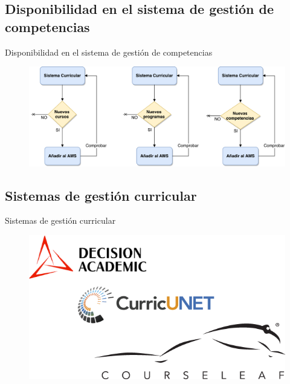 \documentclass[10pt,xcolor=table ]{beamer}
\begin{document}
\subsection{Disponibilidad en el sistema de gestión de competencias}
\begin{frame}{Disponibilidad en el sistema de gestión de competencias}
	\begin{figure}
		\centering
	    \includegraphics[scale=0.35]{../Figuras/problematica/after_creation}
	\end{figure}
\end{frame}


\subsection{Sistemas de gestión curricular}
\begin{frame}{Sistemas de gestión curricular}
	\begin{figure}
		\centering
	    \includegraphics[scale=0.5]{../Figuras/problematica/cms_alternatives}
	\end{figure}
\end{frame}

\end{document}

